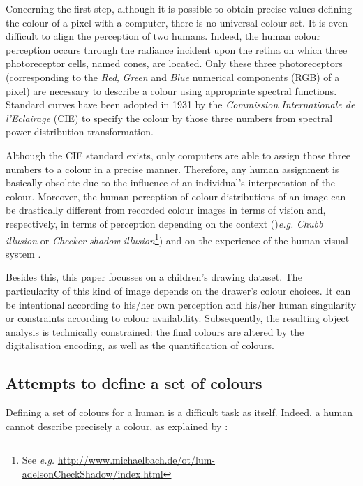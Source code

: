 \documentclass[11pt,a4paper]{article}
\begin{document}
Concerning the first step, although it is possible to obtain precise values defining the colour of a pixel with a computer, there is no universal colour set.
It is even difficult to align the perception of two humans.
Indeed, the human colour perception occurs through the radiance incident upon
the retina on which three photoreceptor cells, named cones, are located.
Only these three photoreceptors (corresponding to the \emph{Red}, \emph{Green} and \emph{Blue} numerical components (RGB) of a pixel) are necessary to describe a colour using appropriate spectral functions. Standard curves have been adopted in 1931 by the \textit{Commission Internationale de l'Eclairage} (CIE) to specify the colour by those three numbers from spectral power distribution transformation.

Although the CIE standard exists, only computers are able to assign
those three numbers to a colour in a precise manner. Therefore, any
human assignment is basically obsolete due to the influence of an
individual's interpretation of the colour. 
Moreover, the human perception of colour distributions of an image can be
drastically different from recorded colour images in terms of vision \cite[see \textit{e.g.}][]{jobson1997} and,
respectively, in terms of perception depending on the context ()\textit{e.g.}
\emph{Chubb illusion}  \cite{ChubbSperlingSolomon1989} or \emph{Checker shadow illusion}\footnote{See \textit{e.g.} \url{http://www.michaelbach.de/ot/lum-adelsonCheckShadow/index.html}}) and on the experience of the human visual system \cite[see \textit{e.g.}][]{LottoPurves2001}.


Besides this, this paper focusses on a children's drawing dataset. 
The particularity of this kind of image depends on the drawer's
colour choices. It can be intentional according to his/her own
perception and his/her human singularity or constraints according to
colour availability. Subsequently, the resulting object analysis is
technically constrained: the final colours are altered by the
digitalisation encoding, as well as the quantification of colours.


\subsection{Attempts to define a set of colours}

Defining a set of colours for a human is a difficult task as itself. Indeed, a human cannot describe precisely a colour, as explained by \citet{wittgenstein1977}:
\end{document}
